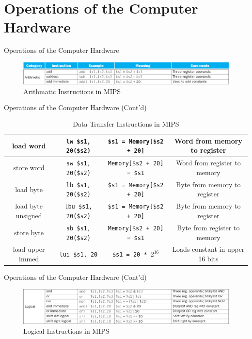 \section{Operations of the Computer Hardware}
\begin{frame}{Operations of the Computer Hardware}
\begin{figure}\caption{Arithmatic Instructions in MIPS}
\begin{center}
\includegraphics[width=\textwidth, height=0.2\textheight]{docs/images/operations-1}
\end{center}
\end{figure}
\end{frame}

\begin{frame}{Operations of the Computer Hardware (Cont'd)}
\begin{table}[H]
\begin{adjustbox}{width=\textwidth}
\begin{tabular}{|c|c|c|c|}
\hline
load word & \texttt{lw \$s1, 20(\$s2)} & \texttt{\$s1 = Memory[\$s2 + 20]} & Word from memory to register \\
\hline
store word & \texttt{sw \$s1, 20(\$s2)} & \texttt{Memory[\$s2 + 20] = \$s1} & Word from register to memory \\
\hline
load byte & \texttt{lb \$s1, 20(\$s2)} & \texttt{\$s1 = Memory[\$s2 + 20]} & Byte from memory to register \\
\hline
load byte unsigned & \texttt{lbu \$s1, 20(\$s2)} & \texttt{\$s1 = Memory[\$s2 + 20]} & Byte from memory to register \\
\hline
store byte & \texttt{sb \$s1, 20(\$s2)} & \texttt{Memory[\$s2 + 20] = \$s1} & Byte from register to memory \\
\hline
load upper immed & \texttt{lui \$s1, 20} & \texttt{\$s1 = 20 * $2^{16}$} & Loads constant in upper 16 bits \\
\hline
\end{tabular}
\end{adjustbox}
\caption{Data Transfer Instructions in MIPS}
\end{table}
\end{frame}

\begin{frame}{Operations of the Computer Hardware (Cont'd)}
\begin{figure}\caption{Logical Instructions in MIPS}
\begin{center}
\includegraphics[width=\textwidth, height=0.4\textheight]{docs/images/operations-3}
\end{center}
\end{figure}
\end{frame}

